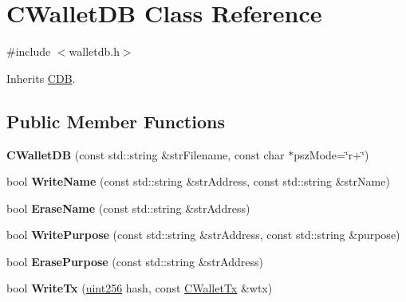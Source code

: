 \hypertarget{class_c_wallet_d_b}{}\section{C\+Wallet\+DB Class Reference}
\label{class_c_wallet_d_b}


{\ttfamily \#include $<$walletdb.\+h$>$}



Inherits \mbox{\hyperlink{class_c_d_b}{C\+DB}}.

\subsection*{Public Member Functions}
\begin{DoxyCompactItemize}
\item 
\mbox{\label{class_c_wallet_d_b_abb8766ee5b03e8115438726c625f88a7}} 
{\bfseries C\+Wallet\+DB} (const std\+::string \&str\+Filename, const char $\ast$psz\+Mode=\char`\"{}r+\char`\"{})
\item 
\mbox{\label{class_c_wallet_d_b_ad1b3bce77e9dd6ddd8c668a469c38f0a}} 
bool {\bfseries Write\+Name} (const std\+::string \&str\+Address, const std\+::string \&str\+Name)
\item 
\mbox{\label{class_c_wallet_d_b_a319209fcf90ea860b668b92c44a3fa7a}} 
bool {\bfseries Erase\+Name} (const std\+::string \&str\+Address)
\item 
\mbox{\label{class_c_wallet_d_b_a8d4e8d73b977dc62c137bd3543c278bf}} 
bool {\bfseries Write\+Purpose} (const std\+::string \&str\+Address, const std\+::string \&purpose)
\item 
\mbox{\label{class_c_wallet_d_b_adaba27cee112077ade5b2e795382cec6}} 
bool {\bfseries Erase\+Purpose} (const std\+::string \&str\+Address)
\item 
\mbox{\label{class_c_wallet_d_b_a76d2ca02898221ab66df5d5f7491164e}} 
bool {\bfseries Write\+Tx} (\mbox{\hyperlink{classuint256}{uint256}} hash, const \mbox{\hyperlink{class_c_wallet_tx}{C\+Wallet\+Tx}} \&wtx)
\item 
\mbox{\label{class_c_wallet_d_b_a498e00c693cacc4b558e6f5295ea32f2}} 

\end{DoxyCompactItemize}
